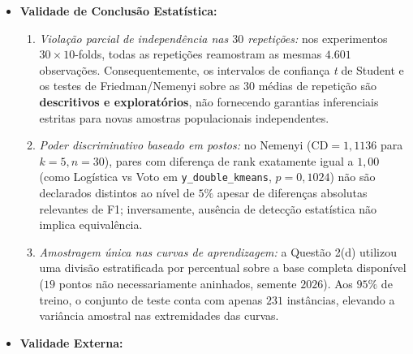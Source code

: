 \documentclass[a4paper,11pt]{article}
\begin{document}
\begin{itemize}[leftmargin=1.5em, itemsep=0.25em, topsep=0.25em]
\begin{enumerate}[leftmargin=1.5em, itemsep=0.25em, topsep=0.25em]
  \item \textit{Não convergência em escala bruta (estudo complementar):} na comparação exploratória de pré-processamento, a Regressão Logística sem escalonamento manteve avisos de não convergência (\texttt{171} em \texttt{y\_\allowbreak original} e \texttt{308} em \texttt{y\_\allowbreak double\_\allowbreak kmeans} mesmo com \texttt{max\_\allowbreak iter=}), exigindo cautela nessa linha específica da comparação.
  \item \textit{Controle de vazamento garantido:} o risco de \textit{data leakage} por pré-processamento ou seleção de hiperparâmetros foi neutralizado por construção (escalonadores e buscas internos em \texttt{Pipeline} restritos ao treino e checados por testes unitários dedicados).
\end{enumerate}
  \item \textbf{Validade de Conclusão Estatística:}
\begin{enumerate}[leftmargin=1.5em, itemsep=0.25em, topsep=0.25em]
  \item \textit{Violação parcial de independência nas $30$ repetições:} nos experimentos $30 \times 10$-folds, todas as repetições reamostram as mesmas $4.601$ observações. Consequentemente, os intervalos de confiança \textit{t} de Student e os testes de Friedman/Nemenyi sobre as $30$ médias de repetição são \textbf{descritivos e exploratórios}, não fornecendo garantias inferenciais estritas para novas amostras populacionais independentes.
  \item \textit{Poder discriminativo baseado em postos:} no Nemenyi ($\text{CD} = 1,1136$ para $k=5, n=30$), pares com diferença de rank exatamente igual a $1,00$ (como Logística vs Voto em \texttt{y\_\allowbreak double\_\allowbreak kmeans}, $p = 0,1024$) não são declarados distintos ao nível de $5\%$ apesar de diferenças absolutas relevantes de F1; inversamente, ausência de detecção estatística não implica equivalência.
  \item \textit{Amostragem única nas curvas de aprendizagem:} a Questão 2(d) utilizou uma divisão estratificada por percentual sobre a base completa disponível ($19$ pontos não necessariamente aninhados, semente $2026$). Aos $95\%$ de treino, o conjunto de teste conta com apenas $231$ instâncias, elevando a variância amostral nas extremidades das curvas.
\end{enumerate}
  \item \textbf{Validade Externa:}
\begin{enumerate}[leftmargin=1.5em, itemsep=0.25em, topsep=0.25em]

\end{enumerate}
\end{itemize}
\end{document}
